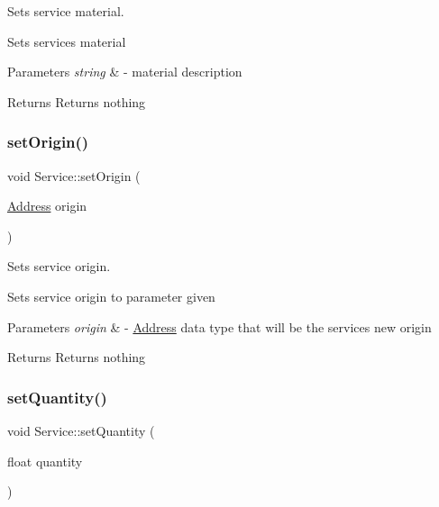 Sets service material. 

Sets service\textquotesingle{}s material 
\begin{DoxyParams}{Parameters}
{\em string} & -\/ material description \\
\hline
\end{DoxyParams}
\begin{DoxyReturn}{Returns}
Returns nothing 
\end{DoxyReturn}
\mbox{\label{class_service_af3f248b1ecea5fd3fb0da198bfdbc7d5}} 
\subsubsection{\texorpdfstring{set\+Origin()}{setOrigin()}}
{\footnotesize\ttfamily void Service\+::set\+Origin (\begin{DoxyParamCaption}\item[{\hyperlink{class_address}{Address}}]{origin }\end{DoxyParamCaption})}



Sets service origin. 

Sets service origin to parameter given 
\begin{DoxyParams}{Parameters}
{\em origin} & -\/ \hyperlink{class_address}{Address} data type that will be the service\textquotesingle{}s new origin \\
\hline
\end{DoxyParams}
\begin{DoxyReturn}{Returns}
Returns nothing 
\end{DoxyReturn}
\mbox{\label{class_service_a29386f4e82e1de1f654468d4a020c6a4}} 
\subsubsection{\texorpdfstring{set\+Quantity()}{setQuantity()}}
{\footnotesize\ttfamily void Service\+::set\+Quantity (\begin{DoxyParamCaption}\item[{float}]{quantity }\end{DoxyParamCaption})}



